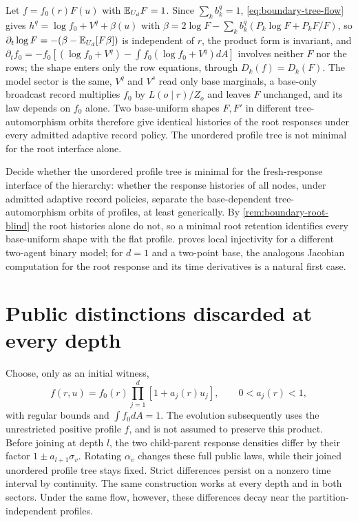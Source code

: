Let $f=f_0(r)F(u)$ with $\mathbb E_{U_d}F=1$. Since $\sum_kb_k^q=1$, \cref{eq:boundary-tree-flow} gives $h^q=\log f_0+V^q+\beta(u)$ with $\beta=2\log F-\sum_kb_k^q(P_k\log F+P_kF/F)$, so $\partial_t\log F=-(\beta-\mathbb E_{U_d}[F\beta])$ is independent of $r$, the product form is invariant, and $\partial_tf_0=-f_0[(\log f_0+V^q)-\int f_0(\log f_0+V^q)dA]$ involves neither $F$ nor the rows; the shape enters only the row equations, through $D_k(f)=D_k(F)$. The model sector is the same, $V^q$ and $V^s$ read only base marginals, a base-only broadcast record multiplies $f_0$ by $L(o\mid r)/Z_o$ and leaves $F$ unchanged, and its law depends on $f_0$ alone. Two base-uniform shapes $F,F'$ in different tree-automorphism orbits therefore give identical histories of the root responses under every admitted adaptive record policy. The unordered profile tree is not minimal for the root interface alone.

Decide whether the unordered profile tree is minimal for the fresh-response interface of the hierarchy: whether the response histories of all nodes, under admitted adaptive record policies, separate the base-dependent tree-automorphism orbits of profiles, at least generically. By \cref{rem:boundary-root-blind} the root histories alone do not, so a minimal root retention identifies every base-uniform shape with the flat profile.  proves local injectivity for a different two-agent binary model; for $d=1$ and a two-point base, the analogous Jacobian computation for the root response and its time derivatives is a natural first case.

\section{Public distinctions discarded at every depth}
\label{sec:boundary-tree-loss}

Choose, only as an initial witness,
\begin{equation}
 f(r,u)=f_0(r)\prod_{j=1}^d[1+a_j(r)u_j],\qquad 0<a_j(r)<1,
 \label{eq:boundary-tree-witness}
\end{equation}
with regular bounds and $\int f_0 dA=1$. The evolution subsequently uses the unrestricted positive profile $f$, and is not assumed to preserve this product. Before joining at depth $l$, the two child-parent response densities differ by their factor $1\pm a_{l+1}\sigma_v$. Rotating $\alpha_v$ changes these full public laws, while their joined unordered profile tree stays fixed. Strict differences persist on a nonzero time interval by continuity. The same construction works at every depth and in both sectors. Under the same flow, however, these differences decay near the partition-independent profiles.

